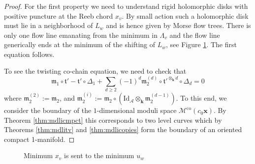 \documentclass{gtpart}
\renewcommand{\k}{\mathbf{k}}
\newcommand{\m}{\mathfrak{m}}
\newcommand{\A}{\mathscr{A}}
\renewcommand{\co}{\mathrm{co}}
\begin{document}
\begin{proof} 
For the first property we need to understand rigid holomorphic disks with positive puncture at the
    Reeb chord $x_{v}$. By small action such a holomorphic disk must lie in a neighborhood of
    $L_{w}$ and is hence given by Morse flow trees. There is only one flow line emanating from the
    minimum in $\Lambda_{v}$ and the flow line generically ends at the minimum of the shifting of
    $L_{w}$, see Figure \ref{mintomin}. The first equation follows. 	
	
To see the twisting co-chain equation,	
we need to check that 
\[ 
\m_1 \circ \mathfrak{t}' - \mathfrak{t}' \circ \Delta_1 + \sum_{d \geq 2} (-1)^d \m_2^{(d)}
\circ {\mathfrak{t}'}^{\otimes_\k d} \circ \Delta_d = 0 
\]
where $\m_2^{(2)} := \m_2$, and $\m_2^{(i)} := \m_2\circ (\mathrm{Id}_\A \otimes_\k \m_2^{(d-1)})$. 
To this end, we consider the boundary of the $1$-dimensional moduli space $\mathcal{M}^{\co}(c_{0}\mathbf{x})$. By Theorem \ref{thm:mdlicmpct} this corresponds to two level curves which by Theorems \ref{thm:mdlitv} and \ref{thm:mdlicopies} form the boundary of an oriented compact 1-manifold. 
\end{proof}

\begin{figure}[h!]
    \centering
    \caption{Minimum $x_v$ is sent to the minimum $u_w$} 
    \label{mintomin}
\end{figure}
\end{document}
